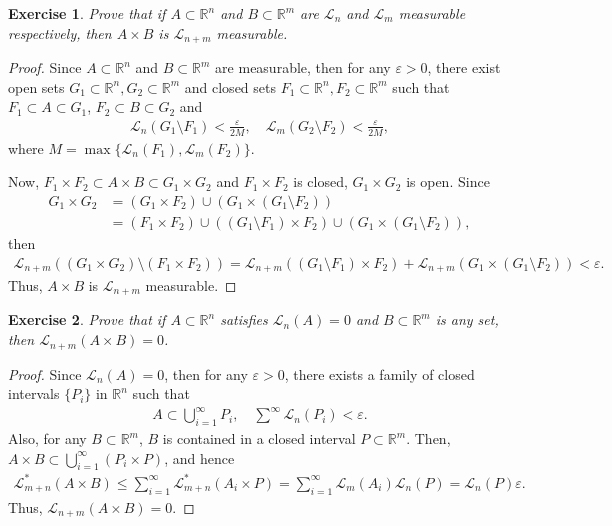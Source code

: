 \documentclass[11pt]{book}
\newtheorem{exercise}{Exercise}[section]
\theoremstyle{definition}
\numberwithin{equation}{chapter}
\begin{document}
\medskip

\begin{exercise}
Prove that if $A\subset\mathbb{R}^n$ and $B\subset\mathbb{R}^m$ are $\mathcal{L}_n$ and $\mathcal{L}_m$ measurable respectively, then $A\times B$ is $\mathcal{L}_{n+m}$ measurable.
\end{exercise}
\begin{proof}\cite{25}
Since $A\subset\mathbb{R}^n$ and $B\subset\mathbb{R}^m$ are measurable, then for any $\varepsilon > 0$, there exist open sets $G_1 \subset \mathbb{R}^n,G_2 \subset \mathbb{R}^m$ and closed sets $F_1 \subset \mathbb{R}^n,F_2 \subset \mathbb{R}^m$ such that $F_1 \subset A \subset G_1$, $F_2 \subset B \subset G_2$ and
\begin{align*}
    \mathcal{L}_n(G_1\setminus F_1) < \frac{\varepsilon}{2M},\quad \mathcal{L}_m(G_2\setminus F_2) < \frac{\varepsilon}{2M},
\end{align*}
where $M = \max\{\mathcal{L}_n(F_1), \mathcal{L}_m(F_2)\}$. 

Now, $F_1 \times F_2 \subset A \times B \subset G_1 \times G_2$ and $F_1 \times F_2$ is closed, $G_1 \times G_2$ is open. Since
\begin{align*}
    G_1 \times G_2 & = \left(G_1 \times F_2\right) \cup (G_1 \times (G_1 \setminus F_2)) \\
    & = \left(F_1 \times F_2\right) \cup \left((G_1 \setminus F_1) \times F_2\right) \cup (G_1 \times (G_1 \setminus F_2)),
\end{align*}
then 
\begin{align*}
    \mathcal{L}_{n+m}\left((G_1 \times G_2) \setminus (F_1 \times F_2)\right) = \mathcal{L}_{n+m}\left((G_1 \setminus F_1) \times F_2\right) + \mathcal{L}_{n+m} (G_1 \times (G_1 \setminus F_2)) < \varepsilon.
\end{align*}
Thus, $A\times B$ is $\mathcal{L}_{n+m}$ measurable.
\end{proof}

\medskip

\begin{exercise}
Prove that if $A\subset\mathbb{R}^n$ satisfies $\mathcal{L}_n(A)=0$ and $B\subset\mathbb{R}^m$ is any set, then
$\mathcal{L}_{n+m}(A\times B)=0$.
\end{exercise}
\begin{proof}
Since $\mathcal{L}_n(A)=0$, then for any $\varepsilon > 0$, there exists a family of closed intervals $\{P_i\}$ in $\mathbb{R}^n$ such that 
\begin{align*}
    A \subset \bigcup^\infty_{i=1} P_i, \quad \sum^\infty \mathcal{L}_n(P_i) < \varepsilon.
\end{align*}
Also, for any $B \subset \mathbb{R}^m$, $B$ is contained in a closed interval $P \subset \mathbb{R}^m$. Then, $A \times B \subset \bigcup^\infty_{i=1}(P_i \times P)$, and hence
\begin{align*}
    \mathcal{L}^*_{m+n}(A \times B) \leq \sum^\infty_{i=1} \mathcal{L}^*_{m+n}(A_i \times P) = \sum^\infty_{i=1} \mathcal{L}_{m}(A_i) \mathcal{L}_{n}(P) = \mathcal{L}_{n}(P) \varepsilon.
\end{align*}
Thus, $\mathcal{L}_{n+m}(A\times B)=0$.
\end{proof}
\end{document}
